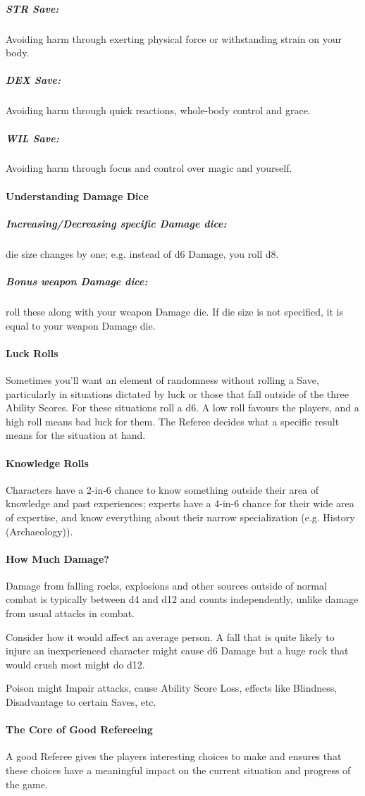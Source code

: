 \documentclass[itdr]{subfiles}
\begin{document}
\subparagraph{STR Save:} Avoiding harm through exerting physical force or withstanding strain on your body.

\subparagraph{DEX Save:} Avoiding harm through quick reactions, whole-body control and grace.

\subparagraph{WIL Save:} Avoiding harm through focus and control over magic and yourself.

\paragraph{Understanding Damage Dice}
\subparagraph{Increasing/Decreasing specific Damage dice:} die size changes by one; e.g. instead of d6 Damage, you roll d8.

\subparagraph{Bonus weapon Damage dice:} roll these along with your weapon Damage die. If die size is not specified, it is equal to your weapon Damage die.

\paragraph{Luck Rolls}
Sometimes you'll want an element of randomness without rolling a Save, particularly in situations dictated by luck or those that fall outside of the three Ability Scores. For these situations roll a d6. A low roll favours the players, and a high roll means bad luck for them. The Referee decides what a specific result means for the situation at hand.

\paragraph{Knowledge Rolls}
Characters have a 2-in-6 chance to know something outside their area of knowledge and past experiences; experts have a 4-in-6 chance for their wide area of expertise, and know everything about their narrow specialization (e.g. History (Archaeology)).

\paragraph{How Much Damage?}
Damage from falling rocks, explosions and other sources outside of normal combat is typically between d4 and d12 and counts independently, unlike damage from usual attacks in combat.

Consider how it would affect an average person. A fall that is quite likely to injure an inexperienced character might cause d6 Damage but a huge rock that would crush most might do d12.

Poison might Impair attacks, cause Ability Score Loss, effects like Blindness, Disadvantage to certain Saves, etc.

\paragraph{The Core of Good Refereeing}
A good Referee gives the players interesting choices to make and ensures that these choices have a meaningful impact on the current situation and progress of the game.
\end{document}
